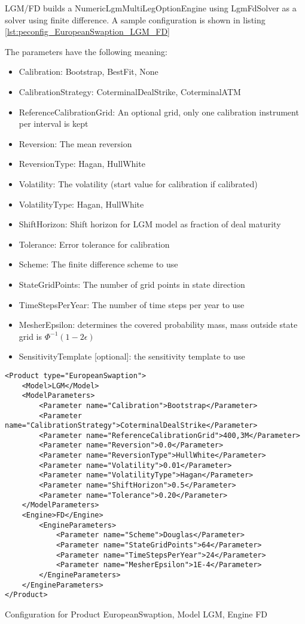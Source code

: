 LGM/FD builds a NumericLgmMultiLegOptionEngine using LgmFdSolver as a solver using finite difference. A sample
configuration is shown in listing \ref{lst:peconfig_EuropeanSwaption_LGM_FD}

The parameters have the following meaning:

\begin{itemize}
\item Calibration: Bootstrap, BestFit, None
\item CalibrationStrategy: CoterminalDealStrike, CoterminalATM
\item ReferenceCalibrationGrid: An optional grid, only one calibration instrument per interval is kept
\item Reversion: The mean reversion
\item ReversionType: Hagan, HullWhite
\item Volatility: The volatility (start value for calibration if calibrated)
\item VolatilityType: Hagan, HullWhite
\item ShiftHorizon: Shift horizon for LGM model as fraction of deal maturity
\item Tolerance: Error tolerance for calibration
\item Scheme: The finite difference scheme to use
\item StateGridPoints: The number of grid points in state direction
\item TimeStepsPerYear: The number of time steps per year to use
\item MesherEpsilon: determines the covered probability mass, mass outside state grid is $\Phi^{-1}(1-2\epsilon)$
\item SensitivityTemplate [optional]: the sensitivity template to use 
\end{itemize}

\begin{longlisting}
\begin{verbatim}
<Product type="EuropeanSwaption">
    <Model>LGM</Model>
    <ModelParameters>
        <Parameter name="Calibration">Bootstrap</Parameter>
        <Parameter name="CalibrationStrategy">CoterminalDealStrike</Parameter>
        <Parameter name="ReferenceCalibrationGrid">400,3M</Parameter>
        <Parameter name="Reversion">0.0</Parameter>
        <Parameter name="ReversionType">HullWhite</Parameter>
        <Parameter name="Volatility">0.01</Parameter>
        <Parameter name="VolatilityType">Hagan</Parameter>
        <Parameter name="ShiftHorizon">0.5</Parameter>
        <Parameter name="Tolerance">0.20</Parameter>
    </ModelParameters>
    <Engine>FD</Engine>
        <EngineParameters>
            <Parameter name="Scheme">Douglas</Parameter>
            <Parameter name="StateGridPoints">64</Parameter>
            <Parameter name="TimeStepsPerYear">24</Parameter>
            <Parameter name="MesherEpsilon">1E-4</Parameter>
        </EngineParameters>
    </EngineParameters>
</Product>
\end{verbatim}
\caption{Configuration for Product EuropeanSwaption, Model LGM, Engine FD}
\label{lst:peconfig_EuropeanSwaption_LGM_FD}
\end{longlisting}

